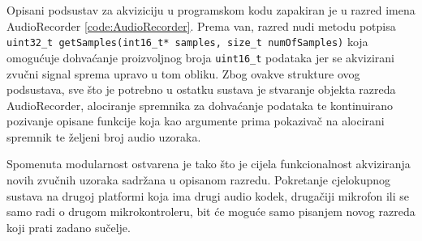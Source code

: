 Opisani podsustav za akviziciju u programskom kodu zapakiran je u razred imena 
AudioRecorder \ref{code:AudioRecorder}. Prema van, razred nudi metodu potpisa
\texttt{uint32\_t getSamples(int16\_t* samples, size\_t numOfSamples)} koja 
omogućuje dohvaćanje proizvoljnog broja \texttt{uint16\_t} podataka jer 
se akvizirani zvučni signal sprema upravo u tom obliku. Zbog ovakve strukture
ovog podsustava, sve što je potrebno u ostatku sustava je stvaranje objekta
razreda AudioRecorder, alociranje spremnika za dohvaćanje podataka te kontinuirano
pozivanje opisane funkcije koja kao argumente prima pokazivač na alocirani spremnik
te željeni broj audio uzoraka.

Spomenuta modularnost ostvarena je tako što je cijela funkcionalnost akviziranja
novih zvučnih uzoraka sadržana u opisanom razredu. Pokretanje cjelokupnog sustava
na drugoj platformi koja ima drugi audio kodek, drugačiji mikrofon ili se samo 
radi o drugom mikrokontroleru, bit će moguće samo pisanjem novog razreda koji
prati zadano sučelje.